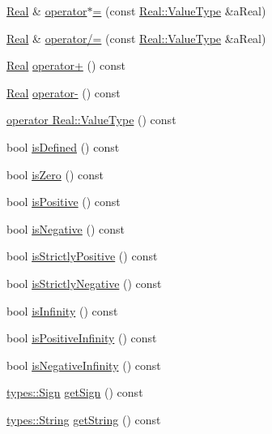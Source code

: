 \begin{DoxyCompactItemize}
\item 
\hyperlink{classlibrary_1_1core_1_1types_1_1Real}{Real} \& \hyperlink{classlibrary_1_1core_1_1types_1_1Real_ae0bdf12b023e5eafaf18e62c7459ccda}{operator$\ast$=} (const \hyperlink{classlibrary_1_1core_1_1types_1_1Real_a9c5c8826b7e5a8e39544d23fea6c0e1c}{Real\+::\+Value\+Type} \&a\+Real)
\item 
\hyperlink{classlibrary_1_1core_1_1types_1_1Real}{Real} \& \hyperlink{classlibrary_1_1core_1_1types_1_1Real_a6a9a6530460f746c7e7fdbba3b6932fe}{operator/=} (const \hyperlink{classlibrary_1_1core_1_1types_1_1Real_a9c5c8826b7e5a8e39544d23fea6c0e1c}{Real\+::\+Value\+Type} \&a\+Real)
\item 
\hyperlink{classlibrary_1_1core_1_1types_1_1Real}{Real} \hyperlink{classlibrary_1_1core_1_1types_1_1Real_a7f39b72df1d66f354dce558a99dc2da5}{operator+} () const
\item 
\hyperlink{classlibrary_1_1core_1_1types_1_1Real}{Real} \hyperlink{classlibrary_1_1core_1_1types_1_1Real_a7a018943c5110e4023f5e462eed70a25}{operator-\/} () const
\item 
\hyperlink{classlibrary_1_1core_1_1types_1_1Real_a04a25244977883708efaa427e411703b}{operator Real\+::\+Value\+Type} () const
\item 
bool \hyperlink{classlibrary_1_1core_1_1types_1_1Real_a424f4e213c63db76b879c294b9126e37}{is\+Defined} () const
\item 
bool \hyperlink{classlibrary_1_1core_1_1types_1_1Real_a7f9a08009b4d5033ff8c9eaa4a6b2c7e}{is\+Zero} () const
\item 
bool \hyperlink{classlibrary_1_1core_1_1types_1_1Real_af2ace2b52781a5e537daef7e6cee6df3}{is\+Positive} () const
\item 
bool \hyperlink{classlibrary_1_1core_1_1types_1_1Real_aa12d6c4d50c80dc184e34d6e52c9dd10}{is\+Negative} () const
\item 
bool \hyperlink{classlibrary_1_1core_1_1types_1_1Real_ac96efb831bb08fd5cfe0f8cfc18ee6b1}{is\+Strictly\+Positive} () const
\item 
bool \hyperlink{classlibrary_1_1core_1_1types_1_1Real_a91029945199886cd83279f29cc225b91}{is\+Strictly\+Negative} () const
\item 
bool \hyperlink{classlibrary_1_1core_1_1types_1_1Real_a4603222d9315aa59355778d66c0b214d}{is\+Infinity} () const
\item 
bool \hyperlink{classlibrary_1_1core_1_1types_1_1Real_a432e5a765554e8656e9bcb6d54f1553d}{is\+Positive\+Infinity} () const
\item 
bool \hyperlink{classlibrary_1_1core_1_1types_1_1Real_a5d7286e45a9f05cda79402c9d8efbc13}{is\+Negative\+Infinity} () const
\item 
\hyperlink{namespacelibrary_1_1core_1_1types_a06d9eaa410d43a0fa3f383040618e87d}{types\+::\+Sign} \hyperlink{classlibrary_1_1core_1_1types_1_1Real_a0e92ad5d5a946dcc64385e1bf47003c8}{get\+Sign} () const
\item 
\hyperlink{classlibrary_1_1core_1_1types_1_1String}{types\+::\+String} \hyperlink{classlibrary_1_1core_1_1types_1_1Real_ac075065c78713b32a2144756efaae7b0}{get\+String} () const
\end{DoxyCompactItemize}
